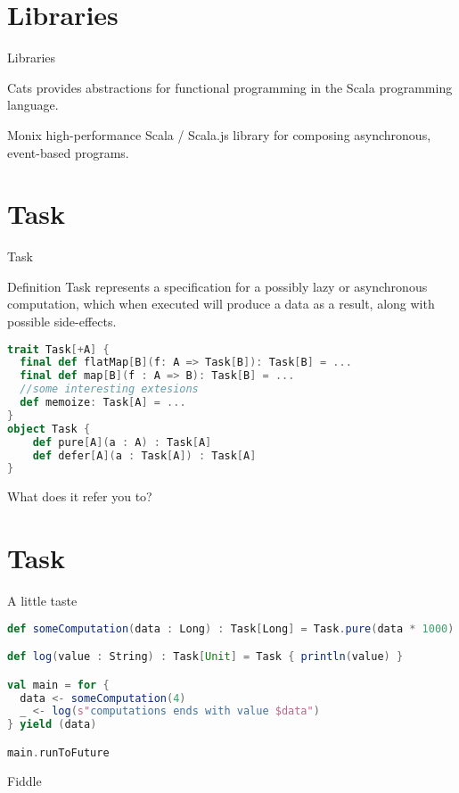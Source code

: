 \documentclass[presentation]{beamer}
\let\oldcite\cite
\renewcommand{\cite}[1]{{\color{blue}\oldcite{#1}}}
\begin{document}
\section{Libraries}
\begin{frame}[fragile]{Libraries}
\begin{block}{Cats \href{https://typelevel.org/cats/}{\faExternalLink} \cite{scalacats2017}}
  provides abstractions for functional programming in the Scala programming language.
\end{block}
\begin{block}{Monix \href{https://monix.io/}{\faExternalLink}}
  high-performance Scala / Scala.js library for composing asynchronous, event-based programs.
\end{block}
\end{frame}
\section{Task}
\begin{frame}[fragile]{Task}
\begin{block}{Definition}
  Task represents a specification for a possibly lazy or asynchronous computation, which when executed will produce a data as a result, along with possible side-effects.
\end{block}
\begin{lstlisting}[language=Scala]
trait Task[+A] {
  final def flatMap[B](f: A => Task[B]): Task[B] = ...
  final def map[B](f : A => B): Task[B] = ...
  //some interesting extesions
  def memoize: Task[A] = ...
}
object Task {
    def pure[A](a : A) : Task[A]
    def defer[A](a : Task[A]) : Task[A]
}
\end{lstlisting}
\begin{center}
  What does it refer you to?
\end{center}
\end{frame}
\section{Task}
\begin{frame}[fragile]{A little taste}

\begin{lstlisting}[language=Scala]
def someComputation(data : Long) : Task[Long] = Task.pure(data * 1000)

def log(value : String) : Task[Unit] = Task { println(value) }

val main = for {
  data <- someComputation(4)
  _ <- log(s"computations ends with value $data")
} yield (data)

main.runToFuture
\end{lstlisting}
\begin{center}
Fiddle \href{https://scalafiddle.io/sf/C4Qon6a/2}{\faExternalLink}
\end{center}
\end{frame}
\end{document}
